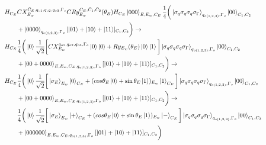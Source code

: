 \begin{equation}
   \resizebox{.9\hsize}{!}{$\begin{split}
        H_{C_E}&CX_{E_w}^{\bar{C}_E,q_{o1},q_{o2},q_{o3},\Gamma_o}CRy_{E_w}^{C_E,\bar{C}_1,\bar{C}_2}(\theta_E)H_{C_E}\ket{000}_{E,E_w,C_E}
        \frac{1}{4}\bigg(
        \ket{\sigma_q\sigma_q\sigma_q\sigma_\Gamma}_{q_{o(1,2,3)},\Gamma_{o}}\ket{00}_{C_1,C_2}\\&+
        \ket{0000}_{q_{o(1,2,3)},\Gamma_o}[\ket{01}+\ket{10}+\ket{11}]_{C_1,C_2}\bigg)\to\\
        H_{C_E}&\frac{1}{4}\bigg(\ket{0}\frac{1}{\sqrt{2}}\bigg[CX_{E_w}^{q_{o1},q_{o2},q_{o3},\Gamma_o}\ket{0}\ket{0}+Ry_{E_w}(\theta_E)\ket{0}\ket{1}\bigg]
        \ket{\sigma_q\sigma_q\sigma_q\sigma_\Gamma}_{q_{o(1,2,3)},\Gamma_{o}}\ket{00}_{C_1,C_2}\\&+
        \ket{00+0000}_{E,E_w,C_E,q_{o(1,2,3)},\Gamma_o}[\ket{01}+\ket{10}+\ket{11}]_{C_1,C_2}\bigg)\to\\
        H_{C_E}&\frac{1}{4}\bigg(\ket{0}\frac{1}{\sqrt{2}}\bigg[\ket{\sigma_E}_{E_w}\ket{0}_{C_E}+(cos\theta_E\ket{0}+\sin\theta_E\ket{1})_{E_w}\ket{1}_{C_E}\bigg]\ket{\sigma_q\sigma_q\sigma_q\sigma_\Gamma}_{q_{o(1,2,3)},\Gamma_{o}}\ket{00}_{C_1,C_2}\\&+
        \ket{00+0000}_{E,E_w,C_E,q_{o(1,2,3)},\Gamma_o}[\ket{01}+\ket{10}+\ket{11}]_{C_1,C_2}\bigg)\to\\
        &\frac{1}{4}\bigg(\ket{0}\frac{1}{\sqrt{2}}\bigg[\ket{\sigma_E}_{E_w}\ket{+}_{C_E}+(cos\theta_E\ket{0}+\sin\theta_E\ket{1})_{E_w}\ket{-}_{C_E}\bigg]\ket{\sigma_q\sigma_q\sigma_q\sigma_\Gamma}_{q_{o(1,2,3)},\Gamma_{o}}\ket{00}_{C_1,C_2}\\&+
        \ket{000000}_{E,E_w,C_E,q_{o(1,2,3)},\Gamma_o}[\ket{01}+\ket{10}+\ket{11}]_{C_1,C_2}\bigg)\\
   \end{split}$}
\end{equation}


